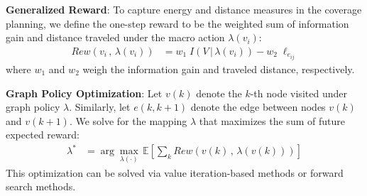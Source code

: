 \documentclass[letterpaper, 10pt, conference]{ieeeconf}      %
\newcommand{\ph}[1]{{\textbf{#1}:}} %
\newcommand{\rev}[1]{{\color{blue}#1}} %
\begin{document}
\ph{Generalized Reward} To capture energy and distance measures in the coverage planning, we define the one-step reward to be the weighted sum of information gain and distance traveled under the macro action $\lambda(v_i)$:
\begin{align}
    Rew(v_i \, , \, \lambda(v_i)) &= w_1 \; I(V \, | \, \lambda(v_i)) - w_2 \; \ell_{e_{ij}}
\end{align}
where $w_1$ and $w_2$ weigh the information gain and traveled distance, respectively. %



\ph{Graph Policy Optimization}
Let $v(k)$ denote the $k$-th node visited under graph policy $\lambda$. Similarly, let $e(k,k+1)$ denote the edge between nodes $v(k)$ and $v(k+1)$.
We solve for the mapping $\lambda$ that maximizes the sum of future expected reward:
\begin{align}
    \lambda^* &= \arg\max_{\lambda(\cdot)} \, \mathbb{E} [ \sum_k Rew(v(k) \, , \, \lambda(v(k))) ]
\end{align}
This optimization can be solved via value iteration-based methods or forward search methods.
\end{document}
